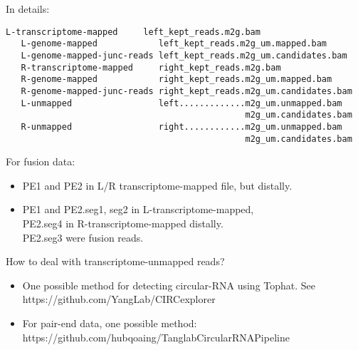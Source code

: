 \begin{frame}[c,fragile]
	\begin{block}{ In details: }
		\begin{lstlisting}[basicstyle=\tiny]
   L-transcriptome-mapped     left_kept_reads.m2g.bam               
   L-genome-mapped            left_kept_reads.m2g_um.mapped.bam     
   L-genome-mapped-junc-reads left_kept_reads.m2g_um.candidates.bam 
   R-transcriptome-mapped     right_kept_reads.m2g.bam              
   R-genome-mapped            right_kept_reads.m2g_um.mapped.bam
   R-genome-mapped-junc-reads right_kept_reads.m2g_um.candidates.bam 
   L-unmapped                 left.............m2g_um.unmapped.bam
                                               m2g_um.candidates.bam
   R-unmapped                 right............m2g_um.unmapped.bam
                                               m2g_um.candidates.bam

		\end{lstlisting}
		For fusion data:
		\begin{itemize}
			\item PE1 and PE2 in L/R transcriptome-mapped file, but distally. \pause
			\item PE1 and PE2.seg1, seg2  in L-transcriptome-mapped, \\PE2.seg4 in R-transcriptome-mapped distally. \\PE2.seg3 were fusion reads.
		\end{itemize}
	\end{block}
\end{frame}

\begin{frame}[c,fragile]
	\begin{block}{ How to deal with \alert{transcriptome-unmapped} reads? }
		\begin{itemize}
			\item One possible method for detecting circular-RNA using Tophat. See https://github.com/YangLab/CIRCexplorer \\ \pause
			\item For pair-end data, one possible method: https://github.com/hubqoaing/TanglabCircularRNAPipeline
		\end{itemize}
	\end{block}
\end{frame}
